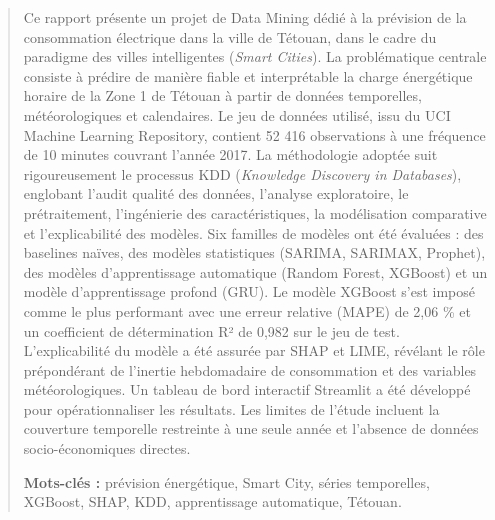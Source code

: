 \documentclass[12pt,a4paper]{article}
\begin{document}
\begin{abstract}
Ce rapport présente un projet de Data Mining dédié à la prévision de la consommation électrique dans la ville de Tétouan, dans le cadre du paradigme des villes intelligentes (\textit{Smart Cities}). La problématique centrale consiste à prédire de manière fiable et interprétable la charge énergétique horaire de la Zone 1 de Tétouan à partir de données temporelles, météorologiques et calendaires. Le jeu de données utilisé, issu du UCI Machine Learning Repository, contient 52 416 observations à une fréquence de 10 minutes couvrant l'année 2017. La méthodologie adoptée suit rigoureusement le processus KDD (\textit{Knowledge Discovery in Databases}), englobant l'audit qualité des données, l'analyse exploratoire, le prétraitement, l'ingénierie des caractéristiques, la modélisation comparative et l'explicabilité des modèles. Six familles de modèles ont été évaluées : des baselines naïves, des modèles statistiques (SARIMA, SARIMAX, Prophet), des modèles d'apprentissage automatique (Random Forest, XGBoost) et un modèle d'apprentissage profond (GRU). Le modèle XGBoost s'est imposé comme le plus performant avec une erreur relative (MAPE) de 2,06 \% et un coefficient de détermination R² de 0,982 sur le jeu de test. L'explicabilité du modèle a été assurée par SHAP et LIME, révélant le rôle prépondérant de l'inertie hebdomadaire de consommation et des variables météorologiques. Un tableau de bord interactif Streamlit a été développé pour opérationnaliser les résultats. Les limites de l'étude incluent la couverture temporelle restreinte à une seule année et l'absence de données socio-économiques directes.

\textbf{Mots-clés :} prévision énergétique, Smart City, séries temporelles, XGBoost, SHAP, KDD, apprentissage automatique, Tétouan.
\end{abstract}
\end{document}
